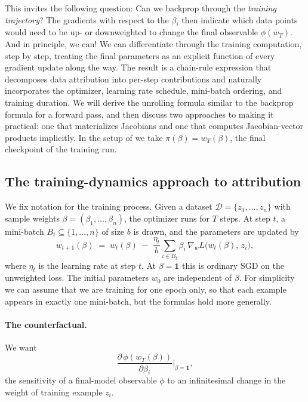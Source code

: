 \documentclass[11pt]{article}
\begin{document}
This invites the following question: Can we backprop through the \emph{training trajectory}? The gradients with respect to the $\beta_i$ then indicate which data points would need to be up- or downweighted to change the final observable $\phi(w_T)$. And in principle, we can! We can differentiate through the training computation, step by step, treating the final parameters as an explicit function of every gradient update along the way. The result is a chain-rule expression that decomposes data attribution into per-step contributions and naturally incorporates the optimizer, learning rate schedule, mini-batch ordering, and training duration. We will derive the unrolling formula similar to the backprop formula for a forward pass, and then discuss two approaches to making it practical: one that materializes Jacobians and one that computes Jacobian-vector products implicitly. In the setup of  we take $\pi(\beta)=w_T(\beta)$, the final checkpoint of the training run.


\subsection{The training-dynamics approach to attribution}\label{subsec:unroll-motivation}

We fix notation for the training process. Given a dataset $\mathcal{D} = \{z_1,\dots,z_n\}$ with sample weights $\beta = (\beta_1,\dots,\beta_n)$, the optimizer runs for $T$ steps. At step $t$, a mini-batch $B_t \subseteq \{1,\dots,n\}$ of size $b$ is drawn, and the parameters are updated by
\begin{equation}\label{eq:sgd-update}
  w_{t+1}(\beta) \;=\; w_t(\beta) \;-\; \frac{\eta_t}{b}\sum_{i\in B_t}\beta_i\,\nabla_w L\bigl(w_t(\beta),\,z_i\bigr),
\end{equation}
where $\eta_t$ is the learning rate at step $t$. At $\beta = \mathbf{1}$ this is ordinary SGD on the unweighted loss. The initial parameters $w_0$ are independent of $\beta$.
For simplicity we can assume that we are training for one epoch only, so that each example appears in exactly one mini-batch, but the formulas hold more generally.

\paragraph{The counterfactual.} We want
\[
  \frac{\partial\,\phi(w_T(\beta))}{\partial \beta_i}\bigg\rvert_{\beta=\mathbf{1}},
\]
the sensitivity of a final-model observable $\phi$ to an infinitesimal change in the weight of training example $z_i$. 
\end{document}
